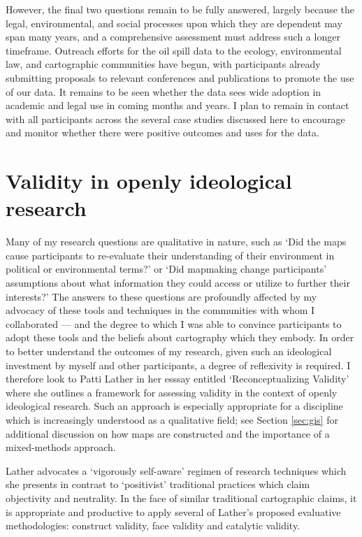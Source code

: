 \documentclass[11pt,oneside,notitlepage]{report}
\begin{document}
{{However, the final two questions remain to be fully answered, largely because the legal, environmental, and social processes upon which they are dependent may span many years, and a comprehensive assessment must address such a longer timeframe. Outreach efforts for the oil spill data to the ecology, environmental law, and cartographic communities have begun, with participants already submitting proposals to relevant conferences and publications to promote the use of our data. It remains to be seen whether the data sees wide adoption in academic and legal use in coming months and years. I plan to remain in contact with all participants across the several case studies discussed here to encourage and monitor whether there were positive outcomes and uses for the data.  

\section{Validity in openly ideological research}
\label{sec:lather}

Many of my research questions are qualitative in nature, such as `Did the maps cause participants to re-evaluate their understanding of their environment in political or environmental terms?' or `Did mapmaking change participants' assumptions about what information they could access or utilize to further their interests?' The answers to these questions are profoundly affected by my advocacy of these tools and techniques in the communities with whom I collaborated --- and the degree to which I was able to convince participants to adopt these tools and the beliefs about cartography which they embody. In order to better understand the outcomes of my research, given such an ideological investment by myself and other participants, a degree of reflexivity is required. I therefore look to Patti Lather in her esssay entitled `Reconceptualizing Validity' where she outlines a framework for assessing validity in the context of openly ideological research. Such an approach is especially appropriate for a discipline which is increasingly understood as a qualitative field; see Section \ref{sec:gis} for additional discussion on how maps are constructed and the importance of a mixed-methods approach. 

Lather advocates a `vigorously self-aware' regimen of research techniques which she presents in contrast to `positivist' traditional practices which claim objectivity and neutrality. In the face of similar traditional cartographic claims, it is appropriate and productive to apply several of Lather's proposed evaluative methodologies: construct validity, face validity and catalytic validity. 

}}
\end{document}
